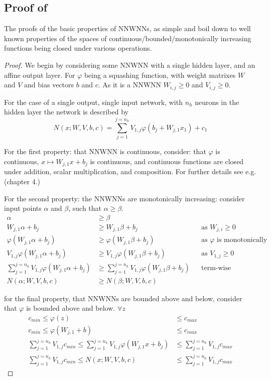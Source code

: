 \documentclass{article} %
\newcommand{\textcite}{\cite}
\begin{document}
\subsection{Proof of }
The proofs of the basic properties of NNWNNs,
as simple and boil down to well known properties of the spaces of continuous/bounded/monotonically increasing functions being closed under various operations.
\begin{proof}
	We begin by considering some NNWNN with a single hidden layer, and an affine output layer.
	For $\varphi$ being a squashing function, with weight matrixes $W$ and $V$ and bias vectors $b$ and $c$.
	As it is a NNWNN $W_{i,j} \ge 0$ and $V_{i,j} \ge 0$.
	
	For the case of a single output, single input network, with $n_h$ neurons in the hidden layer the network is described by
	\begin{equation}
	N(x;W,V,b,c) = \sum_{j=1}^{j=n_h} V_{1,j} \varphi (b_j+W_{j,1}x_1) + c_1
	\end{equation}

	For the first property: that NNWNN is continuous,
	consider: that $\varphi$ is continuous,
	$x \mapsto W_{j,1}x + b_j$ is continuous,
	and continuous functions are closed under addition, scalar multiplication, and composition.
	For further details see e.g. \textcite{rudin1976principles} (chapter 4.)
	
	For the second property: the NNWNNs are monotonically increasing:
	consider input points $\alpha$ and $\beta$, such that $\alpha\ge\beta$.
	\begin{align}
	\alpha &\ge \beta \\
	W_{j,1}\alpha+b_j &\ge W_{j,1}\beta+b_j && \text{as $W_{j,i}\ge0$} \\
	\varphi(W_{j,1}\alpha+b_j) &\ge \varphi(W_{j,1}\beta+b_j) && \text{as $\varphi$ is monotonically increasing} \\
	V_{1,j}\varphi(W_{j,1}\alpha+b_j) &\ge V_{1,j}\varphi(W_{j,1}\beta+b_j) && \text{as $V_{1,j}\ge 0$} \\
	\sum_{j=1}^{j=n_h}V_{1,j}\varphi(W_{j,1}\alpha+b_j) &\ge \sum_{j=1}^{j=n_h}V_{1,j}\varphi(W_{j,1}\beta+b_j) && \text{term-wise} \\
	N(\alpha;W,V,b,c) &\ge N(\beta;W,V,b,c)
	\end{align}

	for the final property, that NNWNNs are bounded above and below,
	consider that $\varphi$ is bounded above and below.
	$\forall z$
	\begin{align}
	c_{min} \le \varphi(z) &\le c_{max} \\
	c_{min} \le \varphi(W_{j,1}+b) &\le c_{max} \\
	\sum_{j=1}^{j=n_h}V_{1,j} c_{min} 
	\le \sum_{j=1}^{j=n_h}V_{1,j}\varphi(W_{j,1}x+b_j)
    &\le \sum_{j=1}^{j=n_h}V_{1,j}c_{max} \\
    \sum_{j=1}^{j=n_h}V_{1,j} c_{min} 
    \le N(x;W,V,b,c)
    &\le \sum_{j=1}^{j=n_h}V_{1,j}c_{max}
	\end{align}	
\end{proof}
\end{document}
